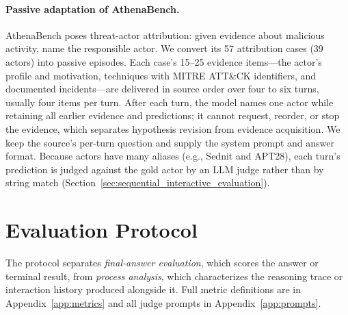 \paragraph{Passive adaptation of AthenaBench.}
AthenaBench poses threat-actor attribution: given evidence about malicious activity, name the responsible actor. We convert its 57 attribution cases (39 actors) into passive episodes. Each case's 15--25 evidence items---the actor's profile and motivation, techniques with MITRE ATT\&CK identifiers, and documented incidents---are delivered in source order over four to six turns, usually four items per turn. After each turn, the model names one actor while retaining all earlier evidence and predictions; it cannot request, reorder, or stop the evidence, which separates hypothesis revision from evidence acquisition. We keep the source's per-turn question and supply the system prompt and answer format. Because actors have many aliases (e.g., Sednit and APT28), each turn's prediction is judged against the gold actor by an LLM judge rather than by string match (Section~\ref{sec:sequential_interactive_evaluation}).

\section{Evaluation Protocol}
\label{sec:evaluation_protocol}
\label{sec:methodology_evaluation_protocol}

The protocol separates \emph{final-answer evaluation}, which scores the answer or terminal result, from \emph{process analysis}, which characterizes the reasoning trace or interaction history produced alongside it. Full metric definitions are in Appendix~\ref{app:metrics} and all judge prompts in Appendix~\ref{app:prompts}.

